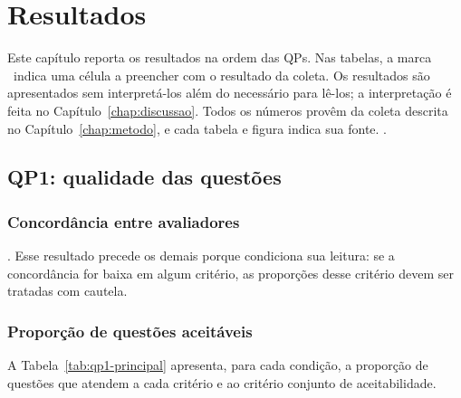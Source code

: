 \chapter{\label{chap:resultados}Resultados}

\newcommand{\figurapendente}[1]{%
  \fbox{\begin{minipage}[c][4.2cm][c]{0.9\textwidth}\centering\small
  \textcolor{red!70!black}{\textbf{[FIGURA PENDENTE]}}\\[2pt] #1\end{minipage}}}

Este capítulo reporta os resultados na ordem das QPs. Nas tabelas, a marca \rr\ indica uma célula a preencher com o resultado da coleta. Os resultados são apresentados sem interpretá-los além do necessário para lê-los; a interpretação é feita no Capítulo~\ref{chap:discussao}. Todos os números provêm da coleta descrita no Capítulo~\ref{chap:metodo}, e cada tabela e figura indica sua fonte. .

\section{QP1: qualidade das questões}

\subsection{Concordância entre avaliadores}

. Esse resultado precede os demais porque condiciona sua leitura: se a concordância for baixa em algum critério, as proporções desse critério devem ser tratadas com cautela.

\subsection{Proporção de questões aceitáveis}

A Tabela~\ref{tab:qp1-principal} apresenta, para cada condição, a proporção de questões que atendem a cada critério e ao critério conjunto de aceitabilidade.

